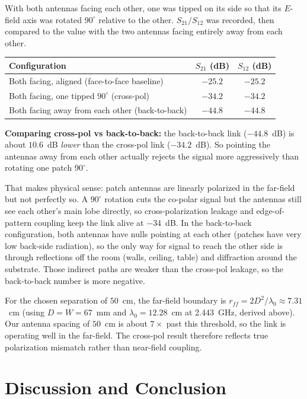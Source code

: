 \documentclass[11pt,letterpaper]{article}
\begin{document}
With both antennas facing each other, one was tipped on its side so that its $E$-field axis was rotated $90^\circ$ relative to the other. $S_{21}/S_{12}$ was recorded, then compared to the value with the two antennas facing entirely away from each other.

\begin{center}
\begin{tabular}{lcc}
\toprule
Configuration & $S_{21}$ (dB) & $S_{12}$ (dB) \\
\midrule
Both facing, aligned (face-to-face baseline)     & $-25.2$ & $-25.2$ \\
Both facing, one tipped $90^\circ$ (cross-pol)    & $-34.2$ & $-34.2$ \\
Both facing away from each other (back-to-back)   & $-44.8$ & $-44.8$ \\
\bottomrule
\end{tabular}
\end{center}

\textbf{Comparing cross-pol vs back-to-back:} the back-to-back link ($-44.8$~dB) is about $10.6$~dB \emph{lower} than the cross-pol link ($-34.2$~dB). So pointing the antennas away from each other actually rejects the signal more aggressively than rotating one patch $90^\circ$.

That makes physical sense: patch antennas are linearly polarized in the far-field but not perfectly so. A $90^\circ$ rotation cuts the co-polar signal but the antennas still see each other's main lobe directly, so cross-polarization leakage and edge-of-pattern coupling keep the link alive at $-34$~dB. In the back-to-back configuration, both antennas have nulls pointing at each other (patches have very low back-side radiation), so the only way for signal to reach the other side is through reflections off the room (walls, ceiling, table) and diffraction around the substrate. Those indirect paths are weaker than the cross-pol leakage, so the back-to-back number is more negative.

For the chosen separation of $50$~cm, the far-field boundary is $r_{ff} = 2D^2/\lambda_0 \approx 7.31$~cm (using $D = W = 67$~mm and $\lambda_0 = 12.28$~cm at 2.443~GHz, derived above). Our antenna spacing of $50$~cm is about $7\times$ past this threshold, so the link is operating well in the far-field. The cross-pol result therefore reflects true polarization mismatch rather than near-field coupling.

\section{Discussion and Conclusion}
\end{document}
